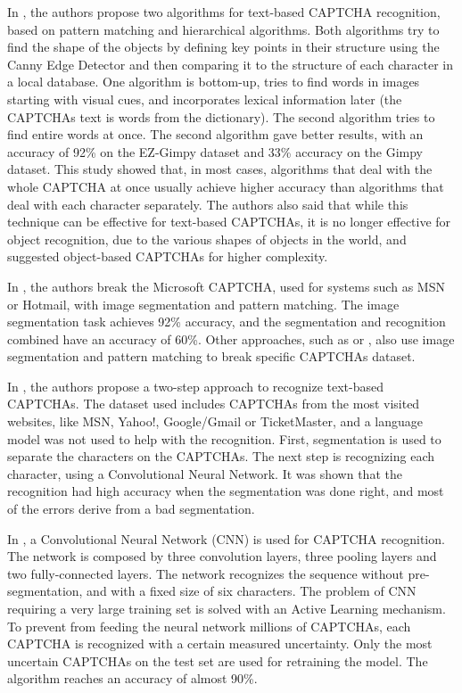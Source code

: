 \documentclass[journal]{IEEEtran}
\begin{document}
In \cite{Mori}, the authors propose two algorithms for text-based CAPTCHA recognition, based on pattern matching and hierarchical algorithms. Both algorithms try to find the shape of the objects by defining key points in their structure using the Canny Edge Detector and then comparing it to the structure of each character in a local database. One algorithm is bottom-up, tries to find words in images starting with visual cues, and incorporates lexical information later (the CAPTCHAs text is words from the dictionary). The second algorithm tries to find entire words at once. The second algorithm gave better results, with an accuracy of 92\% on the EZ-Gimpy dataset and 33\% accuracy on the Gimpy dataset. This study showed that, in most cases, algorithms that deal with the whole CAPTCHA at once usually achieve higher accuracy than algorithms that deal with each character separately. The authors also said that while this technique can be effective for text-based CAPTCHAs, it is no longer effective for object recognition, due to the various shapes of objects in the world, and suggested object-based CAPTCHAs for higher complexity.

In \cite{Yan:2008:LAM:1455770.1455839}, the authors break the Microsoft CAPTCHA, used for systems such as MSN or Hotmail, with image segmentation and pattern matching. The image segmentation task achieves 92\% accuracy, and the segmentation and recognition combined have an accuracy of 60\%. Other approaches, such as \cite{Yan2007} or \cite{Li:2010:BEC:1920261.1920288}, also use image segmentation and pattern matching to break specific CAPTCHAs dataset.

In \cite{NIPS2004_2571}, the authors propose a two-step approach to recognize text-based CAPTCHAs. The dataset used includes CAPTCHAs from the most visited websites, like MSN, Yahoo!, Google/Gmail or TicketMaster, and a language model was not used to help with the recognition. First, segmentation is used to separate the characters on the CAPTCHAs. The next step is recognizing each character, using a Convolutional Neural Network. It was shown that the recognition had high accuracy when the segmentation was done right, and most of the errors derive from a bad segmentation.

In \cite{Stark_captcharecognition}, a Convolutional Neural Network (CNN) is used for CAPTCHA recognition. The network is composed by three convolution layers, three pooling layers and two fully-connected layers. The network recognizes the sequence without pre-segmentation, and with a fixed size of six characters. The problem of CNN requiring a very large training set is solved with an Active Learning mechanism. To prevent from feeding the neural network millions of CAPTCHAs, each CAPTCHA is recognized with a certain measured uncertainty. Only the most uncertain CAPTCHAs on the test set are used for retraining the model. The algorithm reaches an accuracy of almost 90\%.
\end{document}
